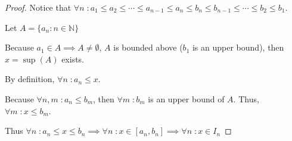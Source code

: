 \documentclass{article} %
\theoremstyle{plain}
\theoremstyle{definition}
\begin{document}
\begin{proof}
    Notice that $\forall n \; \colon a_1 \leq a_2 \leq \cdots \leq a_{n-1} \leq a_n \leq b_n \leq b_{n-1} \leq \cdots \leq b_2 \leq b_1$.

    Let $A = \{a_n \colon n \in \mathbb{N}\}$

    Because $a_1 \in A \implies A \neq \emptyset$, $A$ is bounded above ($b_1$ is an upper bound), then $x = \sup(A)$ exists.

    By definition, $\forall n \; \colon a_n \leq x$.

    Because $\forall n,m \; \colon a_n \leq b_m$, then $\forall m \; \colon b_m$ is an upper bound of $A$.  Thus, $\forall m \; \colon x \leq b_m$.

    Thus $\forall n \; \colon a_n \leq x \leq b_n \implies \forall n \; \colon x \in [a_n, b_n] \implies \forall n \; \colon x \in I_n$
\end{proof} 







    





    
    
\end{document}
